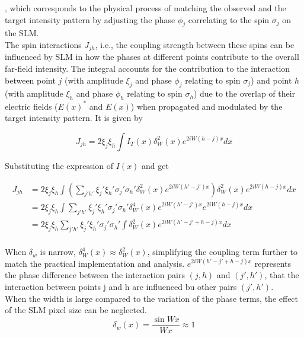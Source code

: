 , which corresponds to the physical process of matching the observed and the target intensity pattern by adjusting the phase $\phi_j$ correlating to the spin $\sigma_j$ on the SLM. \\

The spin interactions $J_{jh}$, i.e., the coupling strength between these spins can be influenced by SLM in how the phases at different points contribute to the overall far-field intensity. The integral accounts for the contribution to the interaction between point $j$ (with amplitude $\xi_j$ and phase $\phi_j$ relating to spin $\sigma_j$) and point $h$ (with amplitude $\xi_h$ and phase $\phi_h$ relating to spin $\sigma_h$) due to the overlap of their electric fields ($E(x)^*$ and $E(x)$) when propagated and modulated by the target intensity pattern. It is given by

\begin{equation}
 J_{jh} = 2 \xi_j \xi_h \int I_T(x) \delta_W^2(x) e^{2iW(h-j)x} dx
\end{equation}

\iffalse
Substituting the expression of $I(x)$ and get

\begin{equation}
\begin{aligned}
    J_{jh} &= 2 \xi_j \xi_h \int \left( \sum_{j'h'} {\xi_j' \xi_h' \sigma_j' \sigma_h' \delta_W^2(x)} e^{2iW(h'-j')x}\right) \delta_W^2(x) e^{2iW(h-j)x} dx \\
    &= 2 \xi_j \xi_h \int \sum_{j'h'} {\xi_j' \xi_h' \sigma_j' \sigma_h' \delta_W^4(x)} e^{2iW(h'-j')x} e^{2iW(h-j)x} dx\\
    &= 2 \xi_j \xi_h \sum_{j'h'} {\xi_j' \xi_h' \sigma_j' \sigma_h' \int \delta_W^2(x)} e^{2iW(h'-j'+ h-j)x} dx \\
\end{aligned}
\end{equation}

When $\delta_w$ is narrow, $\delta_W^4(x) \approx \delta_W^2(x)$, simplifying the coupling term further to match the practical implementation and analysis. $e^{2iW(h'-j'+ h-j)x}$ represents the phase difference between the interaction pairs $(j,h)$ and $(j',h')$, that the interaction between points j and h are influenced bu other pairs $(j', h')$. \\

When the width is large compared to the variation of the phase terms, the effect of the SLM pixel size can be neglected. 
\begin{equation}
\delta_w(x)  = \frac{\sin{Wx}}{Wx}  \approx 1
\end{equation}

